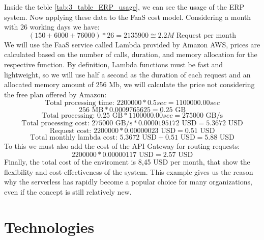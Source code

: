Inside the teble \ref{tab:3_table_ERP_usage}, we can see the usage of the ERP system. Now applying
these data to the FaaS cost model.
Considering a month with 26 working days we have:
\begin{equation}
    (150 + 6000 + 76000) * 26 = 2135900 \cong 2.2M \text{ Request per month}
\end{equation}
We will use the FaaS service called Lambda provided by Amazon AWS, prices are calculated based on
the number of calls, duration, and memory allocation for the respective function. By definition,
Lambda functions must be fast and lightweight, so we will use half a second as the duration of each
request and an allocated memory amount of 256 Mb, we will calculate the price not considering the
free plan offered by Amazon:
\begin{equation}
    \text{Total processing time: } 2200000 * 0.5 sec = 1100000.00 sec
\end{equation}
\begin{equation}
    256 \text{ MB} * 0.0009765625 = 0.25 \text{ GB}
\end{equation}
\begin{equation}
    \text{Total processing: } 0.25 \text{ GB} * 1100000.00 sec = 275000 \text{ GB/s}
\end{equation}
\begin{equation}
    \text{Total processing cost: } 275000 \text{ GB/s} * 0.0000195172 \text{ USD} = 5.3672 \text{ USD}
\end{equation}
\begin{equation}
    \text{Request cost: } 2200000 * 0.00000023 \text{ USD} = 0.51 \text{ USD}
\end{equation}
\begin{equation}
    \text{Total monthly lambda cost: }5.3672 \text{ USD} + 0.51 \text{ USD} = 5.88 \text{ USD}
\end{equation}
To this we must also add the cost of the API Gateway for routing requests:
\begin{equation}
    2200000 * 0.00000117 \text{ USD} = 2.57 \text{ USD}
\end{equation}
Finally, the total cost of the enviroment is 8,45 USD per month, that show the flexibility and
cost-effectiveness of the system. This example gives us the reason why the serverless has rapidly
become a popular choice for many organizations, even if the concept is still relatively new.

\section{Technologies}
